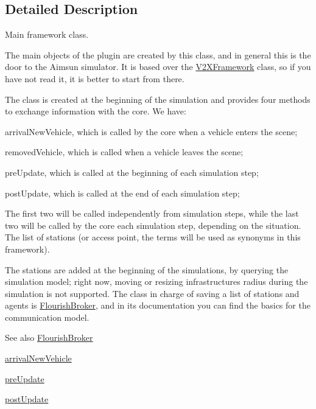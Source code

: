 \subsection{Detailed Description}
Main framework class. 

The main objects of the plugin are created by this class, and in general this is the door to the Aimsun simulator. It is based over the \hyperlink{classV2XFramework}{V2\+X\+Framework} class, so if you have not read it, it is better to start from there.

The class is created at the beginning of the simulation and provides four methods to exchange information with the core. We have\+:


\begin{DoxyItemize}
\item arrival\+New\+Vehicle, which is called by the core when a vehicle enters the scene;
\item removed\+Vehicle, which is called when a vehicle leaves the scene;
\item pre\+Update, which is called at the beginning of each simulation step;
\item post\+Update, which is called at the end of each simulation step;
\end{DoxyItemize}

The first two will be called independently from simulation steps, while the last two will be called by the core each simulation step, depending on the situation. The list of stations (or access point, the terms will be used as synonyms in this framework).

The stations are added at the beginning of the simulations, by querying the simulation model; right now, moving or resizing infrastructures radius during the simulation is not supported. The class in charge of saving a list of stations and agents is \hyperlink{classFlourishBroker}{Flourish\+Broker}, and in its documentation you can find the basics for the communication model.

\begin{DoxySeeAlso}{See also}
\hyperlink{classFlourishBroker}{Flourish\+Broker} 

\hyperlink{classFlourishV2XFramework_a47368514f7814d3d6db4cf8aaf049d3b}{arrival\+New\+Vehicle} 

\hyperlink{classFlourishV2XFramework_a7dc6777db5dc693c67733e50af76c855}{pre\+Update} 

\hyperlink{classFlourishV2XFramework_aa1417bf763cc7b9278df12dfda185010}{post\+Update} 
\end{DoxySeeAlso}


